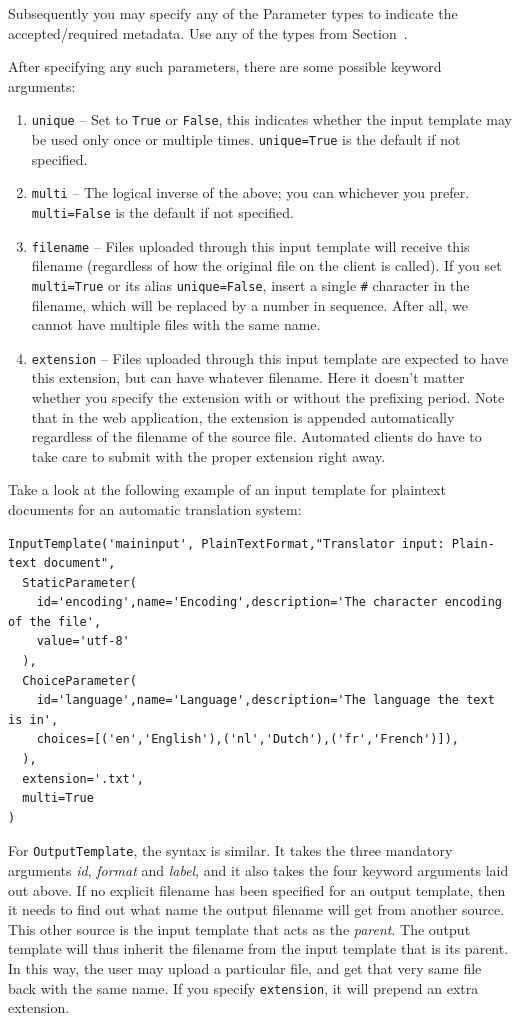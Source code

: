 \documentclass[a4paper,12pt]{report}
\begin{document}
Subsequently you may specify any of the Parameter types to indicate the accepted/required metadata. Use any of the types from Section~\label{sec:parameters}. 

After specifying any such parameters, there are some possible keyword arguments:

\begin{enumerate}
\item \texttt{unique} -- Set to \texttt{True} or \texttt{False}, this indicates whether the input template may be used only once or multiple times. \texttt{unique=True} is the default if not specified.
\item \texttt{multi} -- The logical inverse of the above; you can whichever you prefer. \texttt{multi=False} is the default if not specified.
\item \texttt{filename} -- Files uploaded through this input template will receive this filename (regardless of how the original file on the client is called). If you set \texttt{multi=True} or its alias \texttt{unique=False}, insert a single \texttt{\#} character in the filename, which will be replaced by a number in sequence. After all, we cannot have multiple files with the same name.
\item \texttt{extension} -- Files uploaded through this input template are expected to have this extension, but can have whatever filename. Here it doesn't matter whether you specify the extension with or without the prefixing period. Note that in the web application, the extension is appended automatically regardless of the filename of the source file. Automated clients do have to take care to submit with the proper extension right away. 
\end{enumerate}


Take a look at the following example of an input template for plaintext documents for an automatic translation system:

{\footnotesize{
\begin{verbatim}
InputTemplate('maininput', PlainTextFormat,"Translator input: Plain-text document",  
  StaticParameter(
    id='encoding',name='Encoding',description='The character encoding of the file', 
    value='utf-8'
  ),  
  ChoiceParameter(
    id='language',name='Language',description='The language the text is in', 
    choices=[('en','English'),('nl','Dutch'),('fr','French')]),
  ),      
  extension='.txt',
  multi=True
)
\end{verbatim}
}}


For \texttt{OutputTemplate}, the syntax is similar. It takes the three mandatory arguments \emph{id}, \emph{format} and \emph{label}, and it also takes the four keyword arguments laid out above. If no explicit filename has been specified for an output template, then it needs to find out what name the output filename will get from another source. This other source is the input template that acts as the \emph{parent}. The output template will thus inherit the filename from the input template that is its parent. In this way, the user may upload a particular file, and get that very same file back with the same name. If you specify \texttt{extension}, it will prepend an extra extension. 
\end{document}
